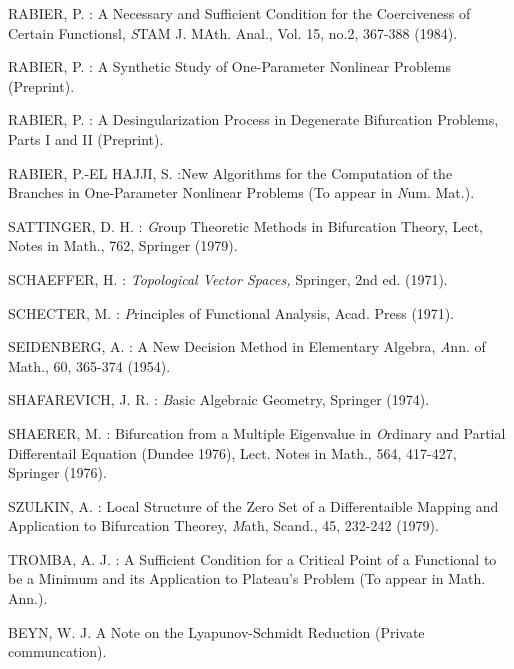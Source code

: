 \begin{thebibliography}{99}
 {RABIER, P. : } A Necessary and Sufficient Condition for
  the Coerciveness of Certain Functionsl, {\textit STAM
    J. MAth. Anal.,} Vol. 15, no.2, 367-388 (1984).

 {RABIER, P. :} A Synthetic Study of One-Parameter
  Nonlinear Problems (Preprint).

 {RABIER, P. :} A Desingularization Process in Degenerate
  Bifurcation Problems, Parts I and II (Preprint).

 {RABIER, P.-EL HAJJI, S. :}\pageoriginale  New Algorithms for the
  Computation of the Branches in One-Parameter Nonlinear Problems (To
  appear in {\textit Num. Mat.}).

 {SATTINGER, D. H. :} {\textit Group Theoretic Methods in
  Bifurcation Theory,} Lect, Notes in Math., 762, Springer (1979).

 {SCHAEFFER, H. :} {\em Topological Vector Spaces,}
  Springer, 2nd ed. (1971).

 {SCHECTER, M. :} {\textit Principles of Functional
  Analysis,} Acad. Press (1971).

 {SEIDENBERG, A. :} A New Decision Method in Elementary
  Algebra, {\textit Ann. of Math.,} 60, 365-374 (1954).

 {SHAFAREVICH, J. R. :} {\textit Basic Algebraic Geometry,
} Springer (1974).

 {SHAERER, M. :} Bifurcation from a Multiple Eigenvalue in
  {\textit Ordinary and Partial Differentail Equation} (Dundee 1976),
  Lect. Notes in Math., 564, 417-427, Springer (1976).

 {SZULKIN, A. :} Local Structure of the Zero Set of a
  Differentaible Mapping and Application to Bifurcation Theorey,
  {\textit Math, Scand.,} 45, 232-242 (1979).

 {TROMBA, A. J. :} A Sufficient Condition for a Critical
  Point of a Functional to be a Minimum and its Application to
  Plateau's Problem (To appear in Math. Ann.).

 {BEYN, W. J.} A Note on the Lyapunov-Schmidt Reduction
  (Private communcation).
\end{thebibliography}


 
